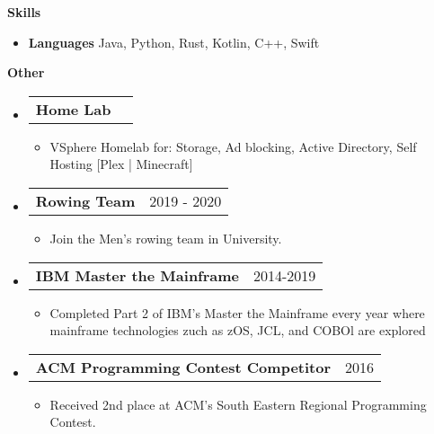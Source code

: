 \documentclass[letterpaper,12pt]{article}[leftmargin=*]
\makeatletter
\def \entryspacing {-0pt}
\renewcommand{\section}[2]{\vspace{5pt}
  \colorbox{secondary}{\color{white}\raggedbottom\normalsize\textbf{{#1}{\hspace{7pt}#2}}}
}
\newcommand{\resumeEntryStart}{\begin{itemize}[leftmargin=2.5mm]}
\newcommand{\resumeEntryEnd}{\end{itemize}\vspace{\entryspacing}}
\newcommand{\resumeItemListStart}{\begin{itemize}[leftmargin=4.5mm]}
\newcommand{\resumeItemListEnd}{\end{itemize}}
\newcommand{\resumeItem}[1]{
  \item\small{
    {#1 \vspace{-2pt}}
  }
}
\newcommand{\resumeEntryTD}[2]{
  \vspace{-1pt}\item[]
    \begin{tabularx}{0.97\textwidth}{X@{\hspace{60pt}}r}
      \textbf{\color{primary}#1} & {\firabook\color{accent}\small#2} \\
    \end{tabularx}\vspace{-6pt}
}
\newcommand{\resumeEntryS}[2]{
  \item[]\small{
    \textbf{\color{primary}#1 }{ #2 \vspace{-6pt}}
  }
}
\makeatother
\begin{document}
\section{\faGears}{Skills}
 \resumeEntryStart
  \resumeEntryS{Languages } {Java, Python, Rust, Kotlin, C++, Swift}
 \resumeEntryEnd
 
 \section{\faGears}{Other}
 \resumeEntryStart
    \resumeEntryTD
      {Home Lab}{}
    \resumeItemListStart
      \resumeItem {VSphere Homelab for: Storage, Ad blocking, Active Directory, Self Hosting [Plex | Minecraft]}
    \resumeItemListEnd
  \resumeEntryEnd
 \resumeEntryStart
    \resumeEntryTD
      {Rowing Team}{2019 - 2020}
    \resumeItemListStart
      \resumeItem {Join the Men's rowing team in University.}
    \resumeItemListEnd
  \resumeEntryEnd
   \resumeEntryStart
    \resumeEntryTD
      {IBM Master the Mainframe}{2014-2019}
    \resumeItemListStart
      \resumeItem {Completed Part 2 of IBM's Master the Mainframe every year where mainframe technologies zuch as zOS, JCL, and COBOl are explored}
    \resumeItemListEnd
  \resumeEntryEnd
  \resumeEntryStart
    \resumeEntryTD
      {ACM Programming Contest Competitor}{2016}
    \resumeItemListStart
      \resumeItem {Received 2nd place at ACM's South Eastern Regional Programming Contest.}
    \resumeItemListEnd
  \resumeEntryEnd
\end{document}
